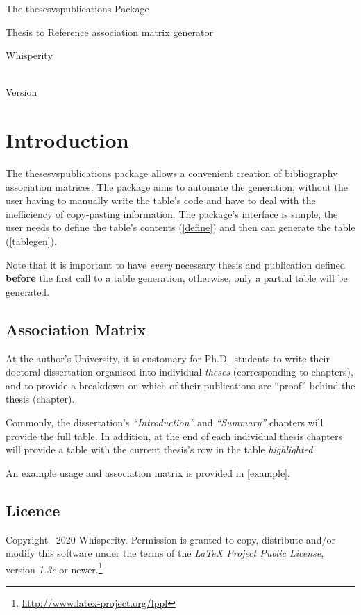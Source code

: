 \documentclass{article}
\begin{document}
\vspace*{0in}
\begin{center}
    \LARGE The \textsf{thesesvspublications} Package \\
    \small \rule{0in}{1em} Thesis to Reference association matrix generator \\
    \large \rule{0in}{2em} Whisperity %
    \rule{0em}{2em}\thesesvspublicationsReleaseDate \\
    Version \thesesvspublicationsVersion
\end{center}


\section{Introduction}\label{intro}
The \textsf{thesesvspublications} package allows a convenient creation of bibliography association matrices.
The package aims to automate the generation, without the user having to manually write the table's code and have to deal with the inefficiency of copy-pasting information.
The package's interface is simple, the user needs to define the table's contents (\cref{define}) and then can generate the table (\cref{tablegen}).

Note that it is important to have \emph{every} necessary thesis and publication defined \textbf{before} the first call to a table generation, otherwise, only a partial table will be generated.

\subsection{Association Matrix}\label{association-mx}
At the author's University, it is customary for Ph.D.\ students to write their doctoral dissertation organised into individual \emph{theses} (corresponding to chapters), and to provide a breakdown on which of their publications are ``proof'' behind the thesis (chapter).

Commonly, the dissertation's \emph{``Introduction''} and \emph{``Summary''} chapters will provide the full table.
In addition, at the end of each individual thesis chapters will provide a table with the current thesis's row in the table \emph{highlighted}.

An example usage and association matrix is provided in \cref{example}.


\subsection{Licence}
Copyright \textcopyright\ 2020 Whisperity.
Permission is granted to copy, distribute and\slash or modify this software under the terms of the \emph{\LaTeX{} Project Public License}, version \emph{1.3c} or newer.\footnote{%
    \url{http://www.latex-project.org/lppl}%
}
\end{document}
